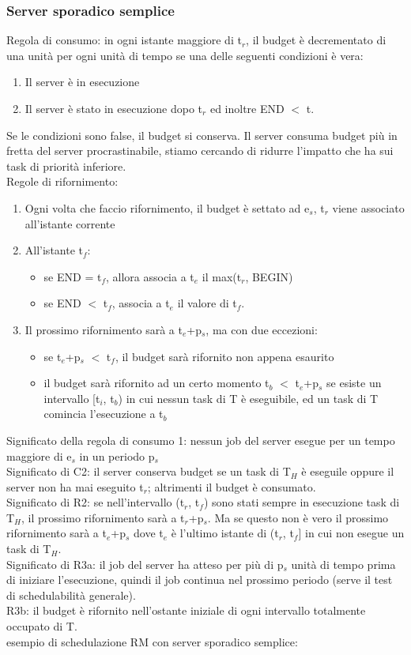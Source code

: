 \documentclass[12pt, oneside]{extbook}
\begin{document}
\subsubsection{Server sporadico semplice}
Regola di consumo: in ogni istante maggiore di t$_{r}$, il budget è decrementato di una unità per ogni unità di tempo se una delle seguenti condizioni è vera:
\begin{enumerate}
\item Il server è in esecuzione
\item Il server è stato in esecuzione dopo t$_{r}$ ed inoltre END $<$ t.
\end{enumerate}
Se le condizioni sono false, il budget si conserva. Il server consuma budget più in fretta del server procrastinabile, stiamo cercando di ridurre l'impatto che ha sui task di priorità inferiore.\\  Regole di rifornimento:
\begin{enumerate}
\item Ogni volta che faccio rifornimento, il budget è settato ad e$_{s}$, t$_{r}$ viene associato all'istante corrente
\item All'istante t$_{f}$:
\begin{itemize}
\item se END = t$_{f}$, allora associa a t$_{e}$ il max(t$_{r}$, BEGIN)
\item se END $<$ t$_{f}$, associa a t$_{e}$ il valore di t$_{f}$.
\end{itemize}
\item Il prossimo rifornimento sarà a t$_{e}$+p$_{s}$, ma con due eccezioni:
\begin{itemize}
\item se t$_{e}$+p$_{s}$ $<$ t$_{f}$, il budget sarà rifornito non appena esaurito
\item il budget sarà rifornito ad un certo momento t$_{b}$ $<$ t$_{e}$+p$_{s}$ se esiste un intervallo [t$_{i}$, t$_{b}$) in cui nessun task di T è eseguibile, ed un task di T comincia l'esecuzione a t$_{b}$
\end{itemize}
\end{enumerate}
Significato della regola di consumo 1: nessun job del server esegue per un tempo maggiore di e$_{s}$ in un periodo p$_{s}$\\ Significato di C2: il server conserva budget se un task di T$_{H}$ è eseguile oppure il server non ha mai eseguito t$_{r}$; altrimenti il budget è consumato.\\ Significato di R2: se nell'intervallo (t$_{r}$, t$_{f}$) sono stati sempre in esecuzione task di T$_{H}$, il prossimo rifornimento sarà a t$_{r}$+p$_{s}$. Ma se questo non è vero il prossimo rifornimento sarà a t$_{e}$+p$_{s}$ dove t$_{e}$ è l'ultimo istante di (t$_{r}$, t$_{f}$] in cui non esegue un task di T$_{H}$.\\ Significato di R3a: il job del server ha atteso per più di p$_{s}$ unità di tempo prima di iniziare l'esecuzione, quindi il job continua nel prossimo periodo (serve il test di schedulabilità generale).\\ R3b: il budget è rifornito nell'ostante iniziale di ogni intervallo totalmente occupato di T. \\ esempio di schedulazione RM con server sporadico semplice:\\
\end{document}
